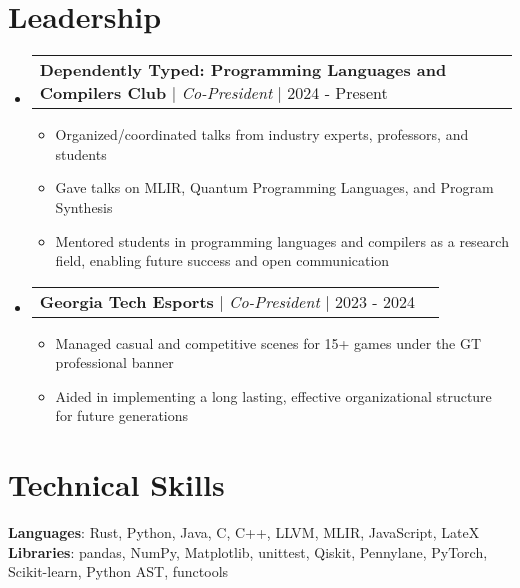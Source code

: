 \documentclass[letterpaper,11pt]{article}
\makeatletter
\newcommand{\resumeItem}[1]{
  \item\small{
    {#1 \vspace{-1pt}}
  }
}
\newcommand{\resumeProjectHeading}[2]{
    \item
    \begin{tabular*}{0.97\textwidth}{l@{\extracolsep{\fill}}r}
      \small#1 & #2 \\
    \end{tabular*}\vspace{-7pt}
}
\newcommand{\resumeSubHeadingListStart}{\begin{itemize}[leftmargin=0.15in, label={}]}
\newcommand{\resumeSubHeadingListEnd}{\end{itemize}}
\newcommand{\resumeItemListStart}{\begin{itemize}}
\newcommand{\resumeItemListEnd}{\end{itemize}\vspace{-5pt}}
\makeatother
\begin{document}
\section{Leadership}
    \resumeSubHeadingListStart
      \resumeProjectHeading
          {\textbf{Dependently Typed: Programming Languages and Compilers Club} $|$ \emph{Co-President} $|$ 2024 - Present}{}
          \resumeItemListStart
            \resumeItem{Organized/coordinated talks from industry experts, professors, and students}
            \resumeItem{Gave talks on MLIR, Quantum Programming Languages, and Program Synthesis}
            \resumeItem{Mentored students in programming languages and compilers as a research field, enabling future success and open communication}
          \resumeItemListEnd
      \resumeProjectHeading
          {\textbf{Georgia Tech Esports} $|$ \emph{Co-President} $|$ 2023 - 2024}{}
          \resumeItemListStart
            \resumeItem{Managed casual and competitive scenes for 15+ games under the GT professional banner}
            \resumeItem{Aided in implementing a long lasting, effective organizational structure for future generations}
          \resumeItemListEnd
    \resumeSubHeadingListEnd

\section{Technical Skills}
 \begin{itemize}[leftmargin=0.15in, label={}]
    \small{\item{
     \textbf{Languages}{: Rust, Python, Java, C, C++, LLVM, MLIR, JavaScript, LateX} \\
     \textbf{Libraries}{: pandas, NumPy, Matplotlib, unittest, Qiskit, Pennylane, PyTorch, Scikit-learn, Python AST, functools}
    }}
 \end{itemize}
\end{document}

